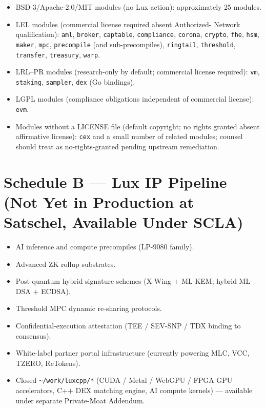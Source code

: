\documentclass[11pt,letterpaper]{article}
\begin{document}
\begin{itemize}[leftmargin=1.5em,itemsep=0.1em]
\item BSD-3/Apache-2.0/MIT modules (no Lux action): approximately 25
modules.
\item LEL modules (commercial license required absent Authorized-
Network qualification): \texttt{aml}, \texttt{broker},
\texttt{captable}, \texttt{compliance}, \texttt{corona},
\texttt{crypto}, \texttt{fhe}, \texttt{hsm}, \texttt{maker},
\texttt{mpc}, \texttt{precompile} (and sub-precompiles),
\texttt{ringtail}, \texttt{threshold}, \texttt{transfer},
\texttt{treasury}, \texttt{warp}.
\item LRL--PR modules (research-only by default; commercial license
required): \texttt{vm}, \texttt{staking}, \texttt{sampler},
\texttt{dex} (Go bindings).
\item LGPL modules (compliance obligations independent of commercial
license): \texttt{evm}.
\item Modules without a LICENSE file (default copyright; no rights
granted absent affirmative license): \texttt{cex} and a small number
of related modules; counsel should treat as no-rights-granted pending
upstream remediation.
\end{itemize}

\section*{Schedule B --- Lux IP Pipeline (Not Yet in Production at
Satschel, Available Under SCLA)}

\begin{itemize}[leftmargin=1.5em,itemsep=0.1em]
\item AI inference and compute precompiles (LP-9080 family).
\item Advanced ZK rollup substrates.
\item Post-quantum hybrid signature schemes (X-Wing + ML-KEM; hybrid
ML-DSA + ECDSA).
\item Threshold MPC dynamic re-sharing protocols.
\item Confidential-execution attestation (TEE / SEV-SNP / TDX binding
to consensus).
\item White-label partner portal infrastructure (currently powering
MLC, VCC, TZERO, ReTokens).
\item Closed \texttt{\textasciitilde/work/luxcpp/*} (CUDA / Metal /
WebGPU / FPGA GPU accelerators, C++ DEX matching engine, AI compute
kernels) --- available under separate Private-Moat Addendum.
\end{itemize}
\end{document}
